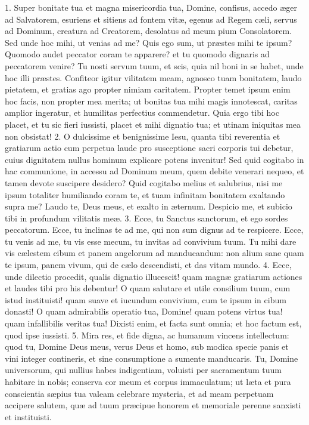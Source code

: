 \documentclass[twoside]{article}
\begin{document}
1. Super bonitate tua et magna misericordia tua, Domine, confisus, accedo æger ad Salvatorem, esuriens et sitiens ad fontem vitæ, egenus ad Regem cæli, servus ad Dominum, creatura ad Creatorem, desolatus ad meum pium Consolatorem. Sed unde hoc mihi, ut venias ad me? Quis ego sum, ut præstes mihi te ipsum? Quomodo audet peccator coram te apparere? et tu quomodo dignaris ad peccatorem venire? Tu nosti servum tuum, et scis, quia nil boni in se habet, unde hoc illi præstes. Confiteor igitur vilitatem meam, agnosco tuam bonitatem, laudo pietatem, et gratias ago propter nimiam caritatem. Propter temet ipsum enim hoc facis, non propter mea merita; ut bonitas tua mihi magis innotescat, caritas amplior ingeratur, et humilitas perfectius commendetur. Quia ergo tibi hoc placet, et tu sic fieri iussisti, placet et mihi dignatio tua; et utinam iniquitas mea non obsistat!
2. O dulcissime et benignissime Iesu, quanta tibi reverentia et gratiarum actio cum perpetua laude pro susceptione sacri corporis tui debetur, cuius dignitatem nullus hominum explicare potens invenitur! Sed quid cogitabo in hac communione, in accessu ad Dominum meum, quem debite venerari nequeo, et tamen devote suscipere desidero? Quid cogitabo melius et salubrius, nisi me ipsum totaliter humiliando coram te, et tuam infinitam bonitatem exaltando supra me? Laudo te, Deus meus, et exalto in æternum. Despicio me, et subicio tibi in profundum vilitatis meæ.
3. Ecce, tu Sanctus sanctorum, et ego sordes peccatorum. Ecce, tu inclinas te ad me, qui non sum dignus ad te respicere. Ecce, tu venis ad me, tu vis esse mecum, tu invitas ad convivium tuum. Tu mihi dare vis cælestem cibum et panem angelorum ad manducandum: non alium sane quam te ipsum, panem vivum, qui de cælo descendisti, et das vitam mundo.
4. Ecce, unde dilectio procedit, qualis dignatio illucescit! quam magnæ gratiarum actiones et laudes tibi pro his debentur! O quam salutare et utile consilium tuum, cum istud instituisti! quam suave et iucundum convivium, cum te ipsum in cibum donasti! O quam admirabilis operatio tua, Domine! quam potens virtus tua! quam infallibilis veritas tua! Dixisti enim, et facta sunt omnia; et hoc factum est, quod ipse iussisti.
5. Mira res, et fide digna, ac humanum vincens intellectum: quod tu, Domine Deus meus, verus Deus et homo, sub modica specie panis et vini integer contineris, et sine consumptione a sumente manducaris. Tu, Domine universorum, qui nullius habes indigentiam, voluisti per sacramentum tuum habitare in nobis; conserva cor meum et corpus immaculatum; ut læta et pura conscientia sæpius tua valeam celebrare mysteria, et ad meam perpetuam accipere salutem, quæ ad tuum præcipue honorem et memoriale perenne sanxisti et instituisti.
\end{document}
